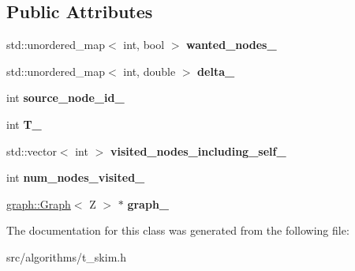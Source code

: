 \subsection*{Public Attributes}
\begin{DoxyCompactItemize}
\item 
\hypertarget{classall__distance__sketch_1_1TSkimReverseRankCallBacks_ac1fa23743d7d2064f5bc8f1ec32e651b}{}std\+::unordered\+\_\+map$<$ int, bool $>$ {\bfseries wanted\+\_\+nodes\+\_\+}\label{classall__distance__sketch_1_1TSkimReverseRankCallBacks_ac1fa23743d7d2064f5bc8f1ec32e651b}

\item 
\hypertarget{classall__distance__sketch_1_1TSkimReverseRankCallBacks_a4427bef2eacebf548f56f30e145acb6d}{}std\+::unordered\+\_\+map$<$ int, double $>$ {\bfseries delta\+\_\+}\label{classall__distance__sketch_1_1TSkimReverseRankCallBacks_a4427bef2eacebf548f56f30e145acb6d}

\item 
\hypertarget{classall__distance__sketch_1_1TSkimReverseRankCallBacks_a127abcde9ca8300e9eba62c8c36b5007}{}int {\bfseries source\+\_\+node\+\_\+id\+\_\+}\label{classall__distance__sketch_1_1TSkimReverseRankCallBacks_a127abcde9ca8300e9eba62c8c36b5007}

\item 
\hypertarget{classall__distance__sketch_1_1TSkimReverseRankCallBacks_a9569753c749b3ea0aa401b89e85ef959}{}int {\bfseries T\+\_\+}\label{classall__distance__sketch_1_1TSkimReverseRankCallBacks_a9569753c749b3ea0aa401b89e85ef959}

\item 
\hypertarget{classall__distance__sketch_1_1TSkimReverseRankCallBacks_a663130af99eec2c92e15ff782a6905ab}{}std\+::vector$<$ int $>$ {\bfseries visited\+\_\+nodes\+\_\+including\+\_\+self\+\_\+}\label{classall__distance__sketch_1_1TSkimReverseRankCallBacks_a663130af99eec2c92e15ff782a6905ab}

\item 
\hypertarget{classall__distance__sketch_1_1TSkimReverseRankCallBacks_a6cb7e9d3aff7ed0aeed7c9594a31eefc}{}int {\bfseries num\+\_\+nodes\+\_\+visited\+\_\+}\label{classall__distance__sketch_1_1TSkimReverseRankCallBacks_a6cb7e9d3aff7ed0aeed7c9594a31eefc}

\item 
\hypertarget{classall__distance__sketch_1_1TSkimReverseRankCallBacks_a95a35ee1e1285fd7257e286565e0e45e}{}\hyperlink{classall__distance__sketch_1_1graph_1_1Graph}{graph\+::\+Graph}$<$ Z $>$ $\ast$ {\bfseries graph\+\_\+}\label{classall__distance__sketch_1_1TSkimReverseRankCallBacks_a95a35ee1e1285fd7257e286565e0e45e}

\end{DoxyCompactItemize}


The documentation for this class was generated from the following file\+:\begin{DoxyCompactItemize}
\item 
src/algorithms/t\+\_\+skim.\+h\end{DoxyCompactItemize}

